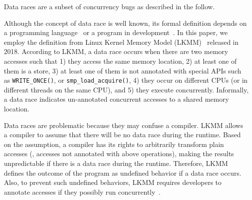 Data races are a subset of concurrency bugs as described in the
follow.

%
Although the concept of data race is well known, its formal definition
depends on a programming language~\cite{C-standard-n2310,
  java-standard} or a program in development~\cite{lkmm}. In this
paper, we employ the definition from Linux Kernel Memory Model
(LKMM)~\cite{lkmm} released in 2018. According to LKMM, a data race
occurs when there are two memory accesses such that 1) they access the
same memory location, 2) at least one of them is a store, 3) at least
one of them is not annotated with special APIs such as
\texttt{WRITE_ONCE()}, or \texttt{smp_load_acquire()}, 4) they occur
on different CPUs (or in different threads on the same CPU), and 5)
they execute concurrently.
%
Informally, a data race indicates un-annotated concurrent accesses to
a shared memory location.

Data races are problematic because they may confuse a compiler.  LKMM
allows a compiler to assume that there will be no data race during the
runtime. Based on the assumption, a compiler has its rights to
arbitrarily transform plain accesses (\ie, accesses not annotated with
above operations), making the results unpredictable if there is a data
race during the runtime.
%
Therefore, LKMM defines the outcome of the program as undefined
behavior if a data race occurs.
%
Also, to prevent such undefined behaviors, LKMM requires developers to
annotate accesses if they possibly run
concurrently~\cite{data-race-fix1, data-race-fix2, data-race-fix3}.





